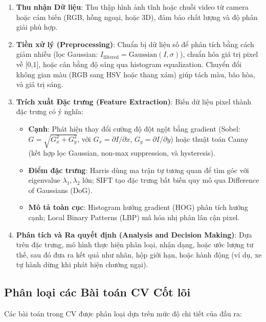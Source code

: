 \begin{enumerate}
    \item \textbf{Thu nhận Dữ liệu}: Thu thập hình ảnh tĩnh hoặc chuỗi video từ camera hoặc cảm biến (RGB, hồng ngoại, hoặc 3D), đảm bảo chất lượng và độ phân giải phù hợp.\autocite{szeliski2010}
    \item \textbf{Tiền xử lý (Preprocessing)}: Chuẩn bị dữ liệu số để phân tích bằng cách giảm nhiễu (lọc Gaussian: $I_{\text{filtered}} = \text{Gaussian}(I, \sigma)$), chuẩn hóa giá trị pixel về [0,1], hoặc cân bằng độ sáng qua histogram equalization. Chuyển đổi không gian màu (RGB sang HSV hoặc thang xám) giúp tách màu, bão hòa, và giá trị sáng.\autocite{szeliski2010}
    \item \textbf{Trích xuất Đặc trưng (Feature Extraction)}: Biến dữ liệu pixel thành đặc trưng có ý nghĩa:
    \begin{itemize}
        \item \textbf{Cạnh}: Phát hiện thay đổi cường độ đột ngột bằng gradient (Sobel: $G = \sqrt{G_x^2 + G_y^2}$, với $G_x = \partial I / \partial x$, $G_y = \partial I / \partial y$) hoặc thuật toán Canny (kết hợp lọc Gaussian, non-max suppression, và hysteresis).\autocite{sobel1968,canny1986}
        \item \textbf{Điểm đặc trưng}: Harris dùng ma trận tự tương quan để tìm góc với eigenvalue $\lambda_1, \lambda_2$ lớn; SIFT tạo đặc trưng bất biến quy mô qua Difference of Gaussians (DoG).\autocite{lowe1999}
        \item \textbf{Mô tả toàn cục}: Histogram hướng gradient (HOG) phân tích hướng cạnh; Local Binary Patterns (LBP) mã hóa nhị phân lân cận pixel.\autocite{dalal2005}
    \end{itemize}
    \item \textbf{Phân tích và Ra quyết định (Analysis and Decision Making)}: Dựa trên đặc trưng, mô hình thực hiện phân loại, nhận dạng, hoặc ước lượng tư thế, sau đó đưa ra kết quả như nhãn, hộp giới hạn, hoặc hành động (ví dụ, xe tự hành dừng khi phát hiện chướng ngại).\autocite{horn1981}
\end{enumerate}

\subsection{Phân loại các Bài toán CV Cốt lõi}
Các bài toán trong CV được phân loại dựa trên mức độ chi tiết của đầu ra:

